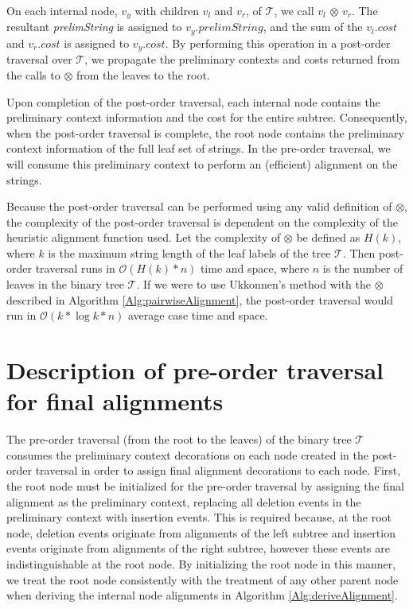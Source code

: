 \documentclass{bmcart}
\begin{document}
On each internal node, $v_y$ with children $v_l$ and $v_r$, of $\mathcal{T}$, we call $v_l$ $\otimes$ $v_r$.
The resultant \textit{prelimString} is assigned to $v_y.prelimString$, and the sum of the $v_l.cost$ and $v_r.cost$ is assigned to $v_y.cost$.
By performing this operation in a post-order traversal over $\mathcal{T}$, we propagate the preliminary contexts and costs returned from the calls to $\otimes$ from the leaves to the root.

Upon completion of the post-order traversal, each internal node contains the preliminary context information and the cost for the entire subtree.
Consequently, when the post-order traversal is complete, the root node contains the preliminary context information of the full leaf set of strings.
In the pre-order traversal, we will consume this preliminary context to perform an (efficient) alignment on the strings.

Because the post-order traversal can be performed using any valid definition of $\otimes$, the complexity of the post-order traversal is dependent on the complexity of the heuristic alignment function used.
Let the complexity of $\otimes$ be defined as $H(k)$, where $k$ is the maximum string length of the leaf labels of the tree $\mathcal{T}$.
Then post-order traversal runs in $\mathcal{O}(H(k) * n)$ time and space, where $n$ is the number of leaves in the binary tree $\mathcal{T}$.
If we were to use Ukkonnen's method with the $\otimes$ described in Algorithm \ref{Alg:pairwiseAlignment}, the post-order traversal would run in $\mathcal{O}(k * \log  k * n)$ average case time and space.


\section*{Description of pre-order traversal for final alignments}

The pre-order traversal (from the root to the leaves) of the binary tree $\mathcal{T}$ consumes the preliminary context decorations on each node created in the post-order traversal in order to assign final alignment decorations to each node.
First, the root node must be initialized for the pre-order traversal by assigning the final alignment as the preliminary context, replacing all deletion events in the preliminary context with insertion events.
This is required because, at the root node, deletion events originate from alignments of the left subtree and insertion events originate from alignments of the right subtree, however these events are indistinguishable at the root node.
By initializing the root node in this manner, we treat the root node consistently with the treatment of any other parent node when deriving the internal node alignments in Algorithm \ref{Alg:deriveAlignment}.
\end{document}
